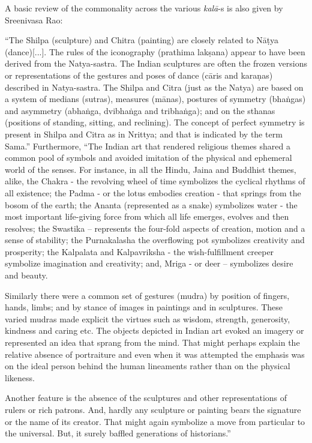 A basic review of the commonality across the various \textsl{kalā}-s is also given by Sreenivasa Rao:

\begin{myquote}
“The Shilpa (sculpture) and Chitra (painting) are closely related to Nāṭya (dance)[...]. The rules of the iconography (prathima lakṣana) appear to have been derived from the Natya-sastra. The Indian sculptures are often the frozen versions or representations of the gestures and poses of dance (cāris and karaṇas) described in Natya-sastra. The Shilpa and Citra (just as the Natya) are based on a system of medians (sutras), measures (mānas), postures of symmetry (bhaṅgas) and asymmetry (abhaṅga, dvibhaṅga and tribhaṅga); and on the sthanas (positions of standing, sitting, and reclining). The concept of perfect symmetry is present in Shilpa and Citra as in Nrittya; and that is indicated by the term Sama.” Furthermore, “The Indian art that rendered religious themes shared a common pool of symbols and avoided imitation of the physical and ephemeral world of the senses. For instance, in all the Hindu, Jaina and Buddhist themes, alike, the Chakra - the revolving wheel of time symbolizes the cyclical rhythms of all existence; the Padma - or the lotus embodies creation - that springs from the bosom of the earth; the Ananta (represented as a snake) symbolizes water - the most important life-giving force from which all life emerges, evolves and then resolves; the Swastika – represents the four-fold aspects of creation, motion and a sense of stability; the Purnakalasha the overflowing pot symbolizes creativity and prosperity; the Kalpalata and Kalpavriksha - the wish-fulfillment creeper symbolize imagination and creativity; and, Mriga - or deer – symbolizes desire and beauty.

Similarly there were a common set of gestures (mudra) by position of fingers, hands, limbs; and by stance of images in paintings and in sculptures. These varied mudras made explicit the virtues such as wisdom, strength, generosity, kindness and caring etc. The objects depicted in Indian art evoked an imagery or represented an idea that sprang from the mind. That might perhaps explain the relative absence of portraiture and even when it was attempted the emphasis was on the ideal person behind the human lineaments rather than on the physical likeness.

Another feature is the absence of the sculptures and other representations of rulers or rich patrons. And, hardly any sculpture or painting bears the signature or the name of its creator. That might again symbolize a move from particular to the universal. But, it surely baffled generations of historians.”
\end{myquote}

